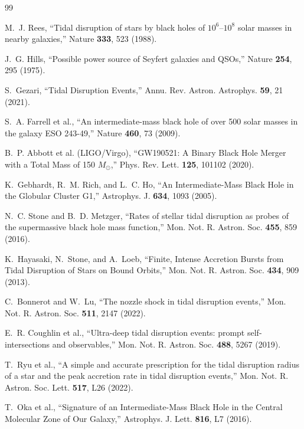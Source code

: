 \documentclass[twocolumn,amsmath,amssymb,prd,superscriptaddress,nofootinbib]{revtex4-2}
\begin{document}
\begin{thebibliography}{99}

M.~J. Rees,
``Tidal disruption of stars by black holes of $10^6$--$10^8$ solar masses in nearby galaxies,''
Nature \textbf{333}, 523 (1988).

J.~G. Hills,
``Possible power source of Seyfert galaxies and QSOs,''
Nature \textbf{254}, 295 (1975).

S.~Gezari,
``Tidal Disruption Events,''
Annu. Rev. Astron. Astrophys. \textbf{59}, 21 (2021).

S.~A. Farrell et al.,
``An intermediate-mass black hole of over 500 solar masses in the galaxy ESO 243-49,''
Nature \textbf{460}, 73 (2009).

B.~P. Abbott et al. (LIGO/Virgo),
``GW190521: A Binary Black Hole Merger with a Total Mass of 150 $M_\odot$,''
Phys. Rev. Lett. \textbf{125}, 101102 (2020).

K.~Gebhardt, R.~M. Rich, and L.~C. Ho,
``An Intermediate-Mass Black Hole in the Globular Cluster G1,''
Astrophys. J. \textbf{634}, 1093 (2005).

N.~C. Stone and B.~D. Metzger,
``Rates of stellar tidal disruption as probes of the supermassive black hole mass function,''
Mon. Not. R. Astron. Soc. \textbf{455}, 859 (2016).

K.~Hayasaki, N.~Stone, and A.~Loeb,
``Finite, Intense Accretion Bursts from Tidal Disruption of Stars on Bound Orbits,''
Mon. Not. R. Astron. Soc. \textbf{434}, 909 (2013).

C.~Bonnerot and W.~Lu,
``The nozzle shock in tidal disruption events,''
Mon. Not. R. Astron. Soc. \textbf{511}, 2147 (2022).

E.~R. Coughlin et al.,
``Ultra-deep tidal disruption events: prompt self-intersections and observables,''
Mon. Not. R. Astron. Soc. \textbf{488}, 5267 (2019).

T.~Ryu et al.,
``A simple and accurate prescription for the tidal disruption radius of a star and the peak accretion rate in tidal disruption events,''
Mon. Not. R. Astron. Soc. Lett. \textbf{517}, L26 (2022).

T.~Oka et al.,
``Signature of an Intermediate-Mass Black Hole in the Central Molecular Zone of Our Galaxy,''
Astrophys. J. Lett. \textbf{816}, L7 (2016).


\end{thebibliography}
\end{document}
